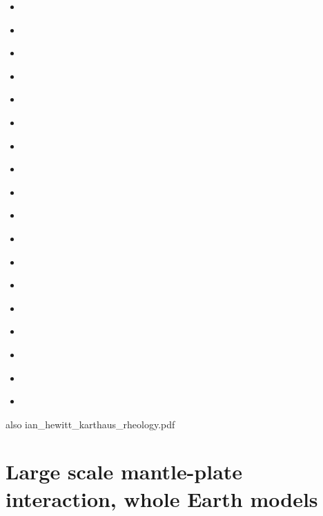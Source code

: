 \begin{scriptsize}
\begin{itemize}
\item[\nineteeneightynine] 
\textcite{buja89} 
\item[\nineteenninety] 
\textcite{vawh90} 
\item[\nineteenninetyfour] 
\textcite{wizh94} 
\item[\nineteenninetyseven] 
\textcite{grev97} 
\item[\twothousandone] 
\textcite{goko01} 
\item[\twothousandfour] 
\textcite{frmm04} 
\item[\twothousandsix] 
\textcite{asbl06} 
\textcite{frmm06} 
\item[\twothousandseven] 
\textcite{susp07} 
\textcite{zwgg07} 
\item[\twothousandeleven] 
\textcite{zhjg11} 
\item[\twothousandtwelve] 
\textcite{pode12} 
\item[\twothousandthirteen] 
\textcite{raab13} 
\item[\twothousandfourteen] 
\textcite{lejx14} 
\textcite{moad14} 
\item[\twothousandfifteen] 
\textcite{issg15} 
\textcite{frlg15} 
\item[\twothousandsixteen] 
\textcite{krab16} 
\textcite{daws16} 
\item[\twothousandseventeen] 
\textcite{lolc17} 
\textcite{gors17} 
\item[\twothousandeighteen] 
\textcite{heah18} 
\textcite{mimr18} 
\item[\twothousandnineteen] 
\textcite{kudd19} 
\textcite{kuwd19} 
\textcite{kuiper19} 
\item[\twothousandtwentyone] 
\textcite{begv21} 
\end{itemize}
\end{scriptsize}


also ian\_hewitt\_karthaus\_rheology.pdf









\section{Large scale mantle-plate interaction, whole Earth models}

